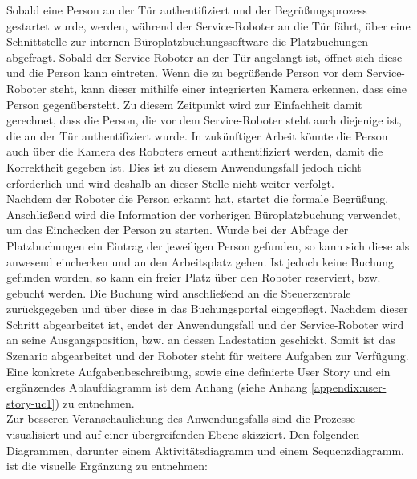     Sobald eine Person an der Tür authentifiziert und der Begrüßungsprozess gestartet wurde, werden, während der Service-Roboter an 
    die Tür fährt, über eine Schnittstelle zur internen Büroplatzbuchungssoftware die Platzbuchungen abgefragt. 
    Sobald der Service-Roboter an der Tür angelangt ist, öffnet sich diese und die Person kann eintreten. Wenn die zu begrüßende 
    Person vor dem Service-Roboter steht, kann dieser mithilfe einer integrierten Kamera erkennen, dass eine Person gegenübersteht. 
    Zu diesem Zeitpunkt wird zur Einfachheit damit gerechnet, dass die Person, die vor dem Service-Roboter steht auch diejenige 
    ist, die an der Tür authentifiziert wurde. In zukünftiger Arbeit könnte die Person auch über die Kamera des Roboters erneut 
    authentifiziert werden, damit die Korrektheit gegeben ist. Dies ist zu diesem Anwendungsfall jedoch nicht erforderlich und 
    wird deshalb an dieser Stelle nicht weiter verfolgt.
    \\
    \linebreak
    Nachdem der Roboter die Person erkannt hat, startet die formale Begrüßung. Anschließend wird die Information der 
    vorherigen Büroplatzbuchung verwendet, um das Einchecken der Person zu starten. Wurde bei der Abfrage der Platzbuchungen ein 
    Eintrag der jeweiligen Person gefunden, so kann sich diese als anwesend einchecken und an den Arbeitsplatz gehen. Ist jedoch keine 
    Buchung gefunden worden, so kann ein freier Platz über den Roboter reserviert, bzw. gebucht werden. Die Buchung wird 
    anschließend an die Steuerzentrale zurückgegeben und über diese in das Buchungsportal eingepflegt. Nachdem dieser 
    Schritt abgearbeitet ist, endet der Anwendungsfall und der Service-Roboter wird an seine Ausgangsposition, bzw. an dessen 
    Ladestation geschickt. Somit ist das Szenario abgearbeitet und der Roboter steht für weitere Aufgaben zur Verfügung. 
    \\
    \linebreak
    Eine konkrete Aufgabenbeschreibung, sowie eine definierte User Story und ein ergänzendes Ablaufdiagramm ist dem Anhang (siehe Anhang \ref{appendix:user-story-uc1}) zu entnehmen. 
    \\
    Zur besseren Veranschaulichung des Anwendungsfalls sind die Prozesse visualisiert und auf einer übergreifenden Ebene skizziert. Den folgenden Diagrammen, darunter 
    einem Aktivitätsdiagramm und einem Sequenzdiagramm, %
    ist die visuelle Ergänzung zu entnehmen: 
    

